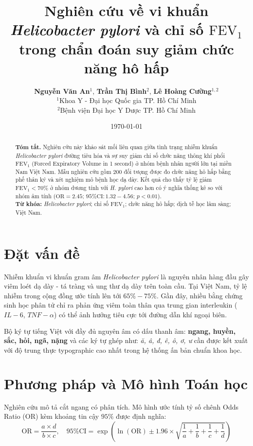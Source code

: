 \documentclass[10pt,a4paper]{article}
\title{\textbf{Nghiên cứu về vi khuẩn \textit{Helicobacter pylori} và chỉ số $\text{FEV}_1$ trong chẩn đoán suy giảm chức năng hô hấp}}
\author{
  \textbf{Nguyễn Văn An}$^{1}$, \textbf{Trần Thị Bình}$^{2}$, \textbf{Lê Hoàng Cường}$^{1,2}$ \\
  $^{1}$Khoa Y - Đại học Quốc gia TP. Hồ Chí Minh \\
  $^{2}$Bệnh viện Đại học Y Dược TP. Hồ Chí Minh
}
\date{\today}
\begin{document}
\maketitle

\begin{abstract}
\textbf{Tóm tắt.} Nghiên cứu này khảo sát mối liên quan giữa tình trạng nhiễm khuẩn \textit{Helicobacter pylori} đường tiêu hóa và sự suy giảm chỉ số chức năng thông khí phổi $\text{FEV}_1$ (Forced Expiratory Volume in 1 second) ở nhóm bệnh nhân người lớn tại miền Nam Việt Nam. Mẫu nghiên cứu gồm 200 đối tượng được đo chức năng hô hấp bằng phế thân ký và xét nghiệm mô bệnh học dạ dày. Kết quả cho thấy tỷ lệ giảm $\text{FEV}_1 < 70\%$ ở nhóm dương tính với \textit{H. pylori} cao hơn có ý nghĩa thống kê so với nhóm âm tính ($\text{OR} = 2.45$; $95\%\text{CI}: 1.32 - 4.56$; $p < 0.01$). \\
\textbf{Từ khóa:} \textit{Helicobacter pylori}; chỉ số $\text{FEV}_1$; chức năng hô hấp; dịch tễ học lâm sàng; Việt Nam.
\end{abstract}

\section{Đặt vấn đề}
Nhiễm khuẩn vi khuẩn gram âm \textit{Helicobacter pylori} là nguyên nhân hàng đầu gây viêm loét dạ dày - tá tràng và ung thư dạ dày trên toàn cầu. Tại Việt Nam, tỷ lệ nhiễm trong cộng đồng ước tính lên tới $65\% - 75\%$. Gần đây, nhiều bằng chứng sinh học phân tử chỉ ra phản ứng viêm toàn thân qua trung gian interleukin ($IL-6$, $TNF-\alpha$) có thể ảnh hưởng tiêu cực tới đường dẫn khí ngoại biên.

Bộ ký tự tiếng Việt với đầy đủ nguyên âm có dấu thanh âm: \textbf{ngang, huyền, sắc, hỏi, ngã, nặng} và các ký tự ghép như: \textit{ă, â, đ, ê, ô, ơ, ư} cần được kết xuất với độ trung thực typographic cao nhất trong hệ thống ấn bản chuẩn khoa học.

\section{Phương pháp và Mô hình Toán học}
Nghiên cứu mô tả cắt ngang có phân tích. Mô hình ước tính tỷ số chênh Odds Ratio (OR) kèm khoảng tin cậy $95\%$ được định nghĩa:
\begin{equation}
\text{OR} = \frac{a \times d}{b \times c}, \quad 95\% \text{CI} = \exp\left(\ln(\text{OR}) \pm 1.96 \times \sqrt{\frac{1}{a} + \frac{1}{b} + \frac{1}{c} + \frac{1}{d}}\right)
\end{equation}
\end{document}
